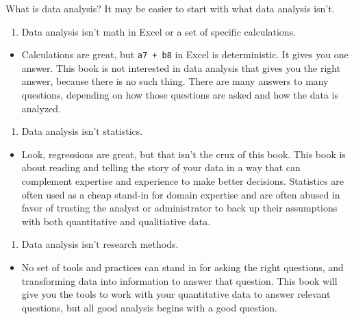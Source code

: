 \documentclass[]{book}
\providecommand{\tightlist}{%
  \setlength{\itemsep}{0pt}\setlength{\parskip}{0pt}}
\begin{document}
What is data analysis? It may be easier to start with what data analysis
isn't.

\begin{enumerate}
\def\labelenumi{\arabic{enumi}.}
\tightlist
\item
  Data analysis isn't math in Excel or a set of specific calculations.
\end{enumerate}

\begin{itemize}
\tightlist
\item
  Calculations are great, but \texttt{a7\ +\ b8} in Excel is
  deterministic. It gives you one answer. This book is not interested in
  data analysis that gives you the right answer, because there is no
  such thing. There are many answers to many questions, depending on how
  those questions are asked and how the data is analyzed.
\end{itemize}

\begin{enumerate}
\def\labelenumi{\arabic{enumi}.}
\setcounter{enumi}{1}
\tightlist
\item
  Data analysis isn't statistics.
\end{enumerate}

\begin{itemize}
\tightlist
\item
  Look, regressions are great, but that isn't the crux of this book.
  This book is about reading and telling the story of your data in a way
  that can complement expertise and experience to make better decisions.
  Statistics are often used as a cheap stand-in for domain expertise and
  are often abused in favor of trusting the analyst or administrator to
  back up their assumptions with both quantitative and qualitiative
  data.
\end{itemize}

\begin{enumerate}
\def\labelenumi{\arabic{enumi}.}
\setcounter{enumi}{2}
\tightlist
\item
  Data analysis isn't research methods.
\end{enumerate}

\begin{itemize}
\tightlist
\item
  No set of tools and practices can stand in for asking the right
  questions, and transforming data into information to answer that
  question. This book will give you the tools to work with your
  quantitative data to answer relevant questions, but all good analysis
  begins with a good question.
\end{itemize}
\end{document}
